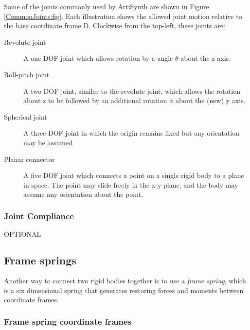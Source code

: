 Some of the joints commonly used by ArtiSynth are shown in Figure
\ref{CommonJoints:fig}. Each illustration shows the allowed joint
motion relative to the base coordinate frame D. Clockwise
from the top-left, these joints are:

\begin{description}

\item[Revolute joint]

A one DOF joint which allows rotation by a angle $\theta$ about
the z axis.

\item[Roll-pitch joint]

A two DOF joint, similar to the revolute joint, which allows the
rotation about z to be followed by an additional rotation $\phi$ about
the (new) y axis.

\item[Spherical joint]

A three DOF joint in which the origin remains fixed but any orientation
may be assumed.

\item[Planar connector]

A five DOF joint which connects a point on a single rigid body to a
plane in space. The point may slide freely in the x-y plane, and the
body may assume any orientation about the point.

\end{description}

\subsubsection{Joint Compliance}
\label{JointCompliance:sec}

OPTIONAL

\subsection{Frame springs}

Another way to connect two rigid bodies together is to use a {\it
frame spring}, which is a six dimensional spring that generates
restoring forces and moments between coordinate frames.

\subsubsection{Frame spring coordinate frames}

